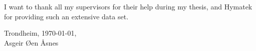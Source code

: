     I want to thank all my supervisors for their help during my thesis, and Hymatek for providing such an extensive data set. 
    
    \begin{center}
    Trondheim, \today, \\
    Asgeir Øen Åsnes
    \end{center}

